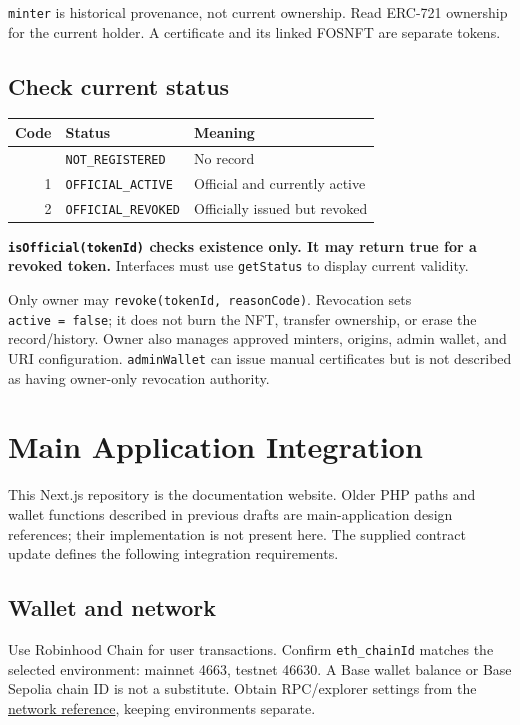 \documentclass[
  10pt,
  letterpaper,
]{article}
\begin{document}
\texttt{minter} is historical provenance, not current ownership. Read
ERC-721 ownership for the current holder. A certificate and its linked
FOSNFT are separate tokens.

\subsection{Check current status}\label{check-current-status}

\begin{longtable}[]{@{}rll@{}}
\toprule\noalign{}
Code & Status & Meaning \\
\midrule\noalign{}
\endhead
\bottomrule\noalign{}
\endlastfoot
0 & \texttt{NOT\_REGISTERED} & No record \\
1 & \texttt{OFFICIAL\_ACTIVE} & Official and currently active \\
2 & \texttt{OFFICIAL\_REVOKED} & Officially issued but revoked \\
\end{longtable}

\textbf{\texttt{isOfficial(tokenId)} checks existence only. It may
return true for a revoked token.} Interfaces must use \texttt{getStatus}
to display current validity.

Only owner may \texttt{revoke(tokenId,\ reasonCode)}. Revocation sets
\texttt{active\ =\ false}; it does not burn the NFT, transfer ownership,
or erase the record/history. Owner also manages approved minters,
origins, admin wallet, and URI configuration. \texttt{adminWallet} can
issue manual certificates but is not described as having owner-only
revocation authority.

\section{Main Application
Integration}\label{main-application-integration}

This Next.js repository is the documentation website. Older PHP paths
and wallet functions described in previous drafts are main-application
design references; their implementation is not present here. The
supplied contract update defines the following integration requirements.

\subsection{Wallet and network}\label{wallet-and-network}

Use Robinhood Chain for user transactions. Confirm \texttt{eth\_chainId}
matches the selected environment: mainnet 4663, testnet 46630. A Base
wallet balance or Base Sepolia chain ID is not a substitute. Obtain
RPC/explorer settings from the
\href{https://github.com/alirezaehteshampour/Fos-Doc/blob/main/content/docs/protocol/platform.mdx}{network
reference}, keeping environments separate.
\end{document}
